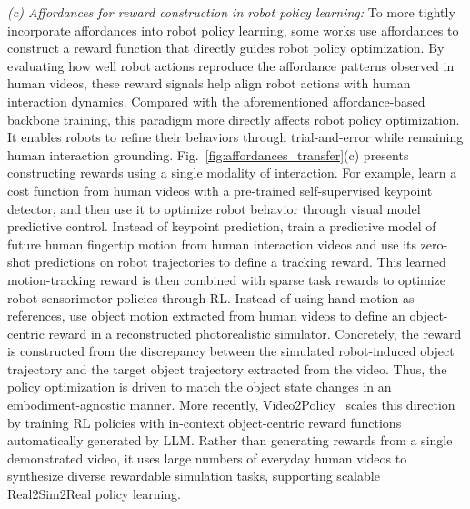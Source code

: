 \documentclass[Afour,sageh,times]{sagej}
\begin{document}
\textit{(c) Affordances for reward construction in robot policy learning:}
To more tightly incorporate affordances into robot policy learning, some works use affordances to construct a reward function that directly guides robot policy optimization. By evaluating how well robot actions reproduce the affordance patterns observed in human videos, these reward signals help align robot actions with human interaction dynamics. Compared with the aforementioned affordance-based backbone training, this paradigm more directly affects robot policy optimization. It enables robots to refine their behaviors through trial-and-error while remaining human interaction grounding. Fig.~\ref{fig:affordances_transfer}(c) presents constructing rewards using a single modality of interaction. For example, \cite{das2021model} learn a cost function from human videos with a pre-trained self-supervised keypoint detector, and then use it to optimize robot behavior through visual model predictive control. Instead of keypoint prediction, \cite{singh2025deep} train a predictive model of future human fingertip motion from human interaction videos and use its zero-shot predictions on robot trajectories to define a tracking reward. This learned motion-tracking reward is then combined with sparse task rewards to optimize robot sensorimotor policies through RL. Instead of using hand motion as references, \cite{dan2025x} use object motion extracted from human videos to define an object-centric reward in a reconstructed photorealistic simulator. Concretely, the reward is constructed from the discrepancy between the simulated robot-induced object trajectory and the target object trajectory extracted from the video. Thus, the policy optimization is driven to match the object state changes in an embodiment-agnostic manner. More recently, Video2Policy~\citep{ye2025video2policy} scales this direction by training RL policies with in-context object-centric reward functions automatically generated by LLM. Rather than generating rewards from a single demonstrated video, it uses large numbers of everyday human videos to synthesize diverse rewardable simulation tasks, supporting scalable Real2Sim2Real policy learning.
\end{document}
